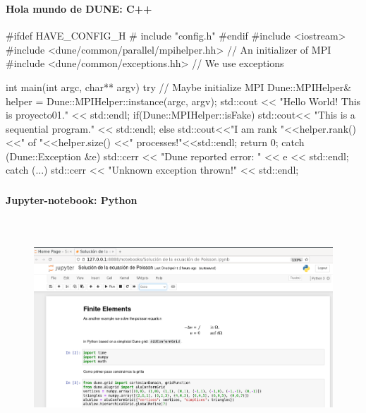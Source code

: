 \begin{frame}[fragile]
	\frametitle{\secname}
	\framesubtitle{Hola mundo de DUNE: C++}
	\small{
		\begin{python}
			#ifdef HAVE_CONFIG_H # include "config.h"
			#endif 	#include <iostream>
			#include <dune/common/parallel/mpihelper.hh> // An initializer of MPI
			#include <dune/common/exceptions.hh> // We use exceptions

			int main(int argc, char** argv)
			{
					try{
							// Maybe initialize MPI
							Dune::MPIHelper& helper = Dune::MPIHelper::instance(argc, argv);
							std::cout << "Hello World! This is proyecto01." << std::endl;
							if(Dune::MPIHelper::isFake)
							std::cout<< "This is a sequential program." << std::endl;
							else
							std::cout<<"I am rank "<<helper.rank()<<" of "<<helper.size()
							<<" processes!"<<std::endl;
							return 0;
						}
					catch (Dune::Exception &e){
							std::cerr << "Dune reported error: " << e << std::endl;
						}
					catch (...){
							std::cerr << "Unknown exception thrown!" << std::endl;
						}
				}
		\end{python}
	}
\end{frame}
\begin{frame}
	\frametitle{\secname}
	\framesubtitle{Jupyter-notebook: Python}
	\begin{figure}[ht!]
		\centering
		\includegraphics[height=8cm, width=12cm]{jupyter01}
	\end{figure}
\end{frame}

